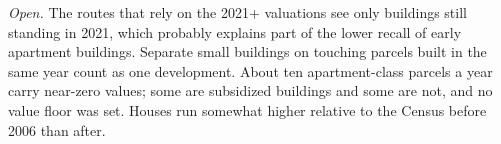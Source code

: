 \textit{Open.} The routes that rely on the 2021+ valuations see only buildings still standing in 2021, which probably
explains part of the lower recall of early apartment buildings. Separate small buildings on touching parcels built in
the same year count as one development. About ten apartment-class parcels a year carry near-zero values; some are
subsidized buildings and some are not, and no value floor was set. Houses run somewhat higher relative to the Census
before 2006 than after.
